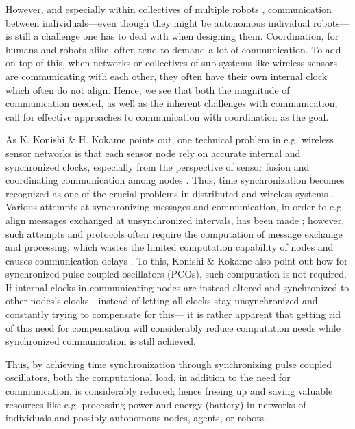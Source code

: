 
However, and especially within collectives of multiple robots \cite{cocoro, swarm_bot}, communication between individuals—even though they might be autonomous individual robots—is still a challenge one has to deal with when designing them. Coordination, for humans and robots alike, often tend to demand a lot of communication. To add on top of this, when networks or collectives of sub-systems like wireless sensors are communicating with each other, they often have their own internal clock which often do not align. Hence, we see that both the magnitude of communication needed, as well as the inherent challenges with communication, call for effective approaches to communication with coordination as the goal.

As K. Konishi \& H. Kokame points out, one technical problem in e.g. wireless sensor networks is that each sensor node rely on accurate internal and synchronized clocks, especially from the perspective of sensor fusion and coordinating communication among nodes \cite{konishi_kokame}. Thus, time synchronization becomes recognized as one of the crucial problems in distributed and wireless systems \cite{tungvinte_sync_protocols}. Various attempts at synchronizing messages and communication, in order to e.g. align messages exchanged at unsynchronized intervals, has been made \cite{tungvinte_sync_protocols}; however, such attempts and protocols often require the computation of message exchange and processing, which wastes the limited computation capability of nodes and causes communication delays \cite{konishi_kokame}. To this, Konishi \& Kokame also point out how for synchronized pulse coupled oscillators (PCOs), such computation is not required. If internal clocks in communicating nodes are instead altered and synchronized to other nodes's clocks—instead of letting all clocks stay unsynchronized and constantly trying to compensate for this— it is rather apparent that getting rid of this need for compensation will considerably reduce computation needs while synchronized communication is still achieved.

Thus, by achieving time synchronization \cite{tungvinte_sync_protocols} through synchronizing pulse coupled oscillators, both the computational load, in addition to the need for communication, is considerably reduced; hence freeing up and saving valuable resources like e.g. processing power and energy (battery) in networks of individuals and possibly autonomous nodes, agents, or robots.


